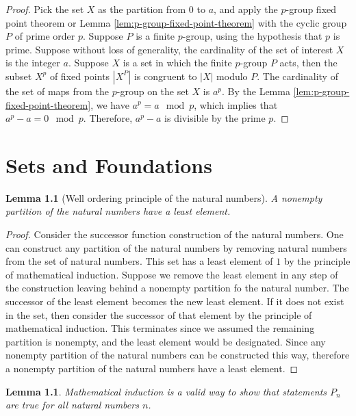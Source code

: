 \documentclass{tufte-book}
\newtheorem{lemma}[theorem]{Lemma}
\begin{document}
\begin{proof}
  Pick the set $X$ as the partition from $0$ to $a$, and apply the $p$-group fixed point theorem or Lemma \ref{lem:p-group-fixed-point-theorem} with the cyclic group $P$ of prime order $p$.
  Suppose $P$ is a finite $p$-group, using the hypothesis that $p$ is prime.
  Suppose without loss of generality, the cardinality of the set of interest $X$ is the integer $a$.
  Suppose $X$ is a set in which the finite $p$-group $P$ acts, then the subset $X^{p}$ of fixed points $|X^P|$ is congruent to $|X|$ modulo $P$. The cardinality of the set of maps from the $p$-group on the set $X$ is 
  $a^p$. By the Lemma \ref{lem:p-group-fixed-point-theorem}, we have $a^p = a \mod p$, which implies that $a^p - a = 0 \mod p$. Therefore, $a^p - a$ is divisible by the prime $p$.
\end{proof}

\chapter{Sets and Foundations}

\begin{lemma}[Well ordering principle of the natural numbers]
  A nonempty partition of the natural numbers have a least element.
\end{lemma}

\begin{proof}
  Consider the successor function construction of the natural numbers.
  One can construct any partition of the natural numbers by removing natural numbers from the set of natural numbers.
  This set has a least element of $1$ by the principle of mathematical induction.
  Suppose we remove the least element in any step of the construction leaving behind a nonempty partition fo the natural number. 
  The successor of the least element becomes the new least element. If it does not exist in the set, then consider the successor of that element by the principle of mathematical induction. This terminates since we assumed the remaining partition is nonempty, and the least element would be designated. Since any nonempty partition of the natural numbers can be constructed this way, therefore a nonempty partition of the natural numbers have a least element.
\end{proof}

\begin{lemma}
  Mathematical induction is a valid way to show that statements $P_n$ are true for all natural numbers $n$.
\end{lemma}
\end{document}
